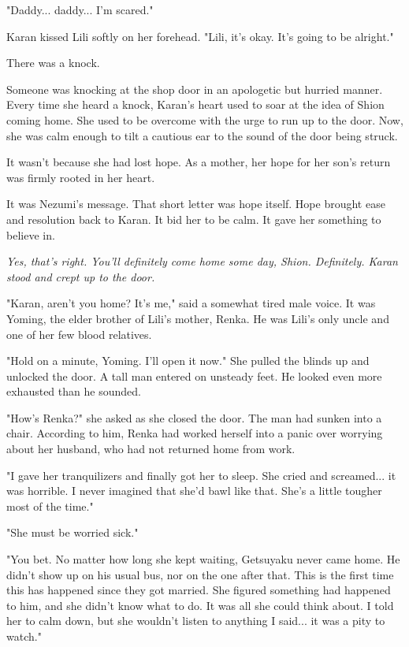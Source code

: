 "Daddy... daddy... I'm scared."

Karan kissed Lili softly on her forehead. "Lili, it's okay. It's going
to be alright."

There was a knock.

Someone was knocking at the shop door in an apologetic but hurried
manner. Every time she heard a knock, Karan's heart used to soar at the
idea of Shion coming home. She used to be overcome with the urge to run
up to the door. Now, she was calm enough to tilt a cautious ear to the
sound of the door being struck.

It wasn't because she had lost hope. As a mother, her hope for her son's
return was firmly rooted in her heart.


It was Nezumi's message. That short letter was hope itself. Hope brought
ease and resolution back to Karan. It bid her to be calm. It gave her
something to believe in.


\emph{Yes, that's right. You'll definitely come home some day, Shion.
Definitely. Karan stood and crept up to the door.}

"Karan, aren't you home? It's me," said a somewhat tired male voice. It
was Yoming, the elder brother of Lili's mother, Renka. He was Lili's
only uncle and one of her few blood relatives.

"Hold on a minute, Yoming. I'll open it now." She pulled the blinds up
and unlocked the door. A tall man entered on unsteady feet. He looked
even more exhausted than he sounded.

"How's Renka?" she asked as she closed the door. The man had sunken into
a chair. According to him, Renka had worked herself into a panic over
worrying about her husband, who had not returned home from work.

"I gave her tranquilizers and finally got her to sleep. She cried and
screamed... it was horrible. I never imagined that she'd bawl like that.
She's a little tougher most of the time."

"She must be worried sick."

"You bet. No matter how long she kept waiting, Getsuyaku never came
home. He didn't show up on his usual bus, nor on the one after that.
This is the first time this has happened since they got married. She
figured something had happened to him, and she didn't know what to do.
It was all she could think about. I told her to calm down, but she
wouldn't listen to anything I said... it was a pity to watch."

